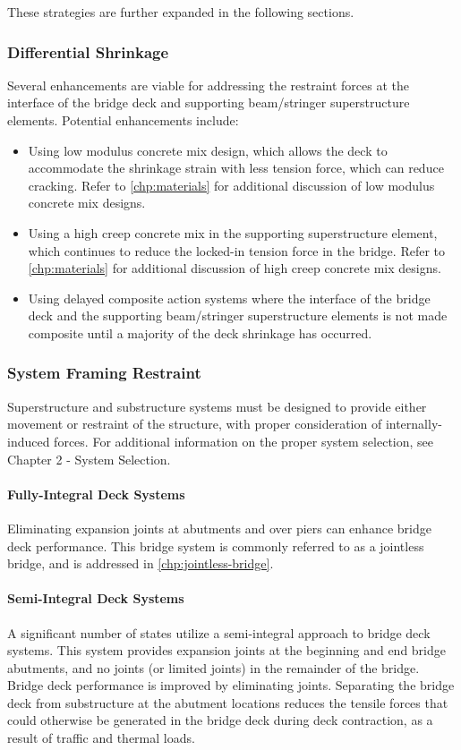 These strategies are further expanded in the following sections.

\subsubsection{Differential Shrinkage}
Several enhancements are viable for addressing the restraint forces at the interface of the bridge deck and
supporting beam/stringer superstructure elements. Potential enhancements include:
\begin{itemize}
  \item Using low modulus concrete mix design, which allows the deck to accommodate the shrinkage strain with
  less tension force, which can reduce cracking. Refer to \cref{chp:materials} for additional discussion of low modulus
  concrete mix designs.
  \item Using a high creep concrete mix in the supporting superstructure element, which continues to reduce the
  locked-in tension force in the bridge. Refer to \cref{chp:materials} for additional discussion of high creep concrete mix
  designs.
  \item Using delayed composite action systems where the interface of the bridge deck and the supporting
  beam/stringer superstructure elements is not made composite until a majority of the deck shrinkage has
  occurred.
\end{itemize}

\subsubsection{System Framing Restraint}
Superstructure and substructure systems must be designed to provide either movement or restraint of the
structure, with proper consideration of internally-induced forces. For additional information on the proper system
selection, see Chapter 2 - System Selection.

\paragraph{Fully-Integral Deck Systems}
Eliminating expansion joints at abutments and over piers can enhance bridge deck performance. This bridge
system is commonly referred to as a jointless bridge, and is addressed in \cref{chp:jointless-bridge}.

\paragraph{Semi-Integral Deck Systems}
A significant number of states utilize a semi-integral approach to bridge deck systems. This system provides
expansion joints at the beginning and end bridge abutments, and no joints (or limited joints) in the remainder of the
bridge. Bridge deck performance is improved by eliminating joints. Separating the bridge deck from substructure at
the abutment locations reduces the tensile forces that could otherwise be generated in the bridge deck during deck
contraction, as a result of traffic and thermal loads.


